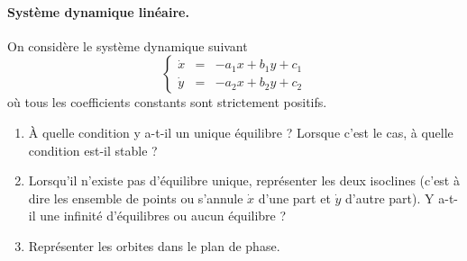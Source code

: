 \paragraph{Système dynamique linéaire.} 
On considère le système dynamique suivant
$$
\left\{\begin{array}{rcl}
        \dot x & = & -a_1 x + b_1 y + c_1 \\ 
        \dot y & = & -a_2 x + b_2 y + c_2
        \end{array}\right.
$$
où tous les coefficients constants sont strictement positifs.
\begin{enumerate}
  \item À quelle condition y a-t-il un unique équilibre ? Lorsque c’est le cas, à quelle condition est-il stable ?
  \item Lorsqu’il n’existe pas d’équilibre unique, représenter les deux isoclines (c'est à dire les ensemble de points ou s'annule $\dot x$ d'une part et $\dot y$ d'autre part). Y a-t-il une infinité d’équilibres ou aucun équilibre ?
  \item Représenter les orbites dans le plan de phase.
\end{enumerate}

\solution{\todo{}}

